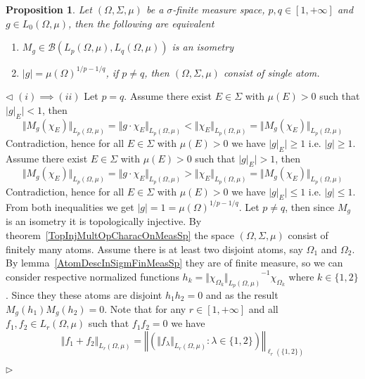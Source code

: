 \documentclass[12pt]{article}
\newtheorem{proposition}[theorem]{Proposition}
\newenvironment{proof}{\par $\triangleleft$}{$\triangleright$}
\begin{document}
\begin{proposition}\label{IsomMultOpCharacOnMeasSp}
    Let $(\Omega,\Sigma,\mu)$ be a $\sigma$-finite measure space,
    $p,q\in[1,+\infty]$ and $g\in L_0(\Omega,\mu)$, then the following
    are equivalent
    \begin{enumerate}[label = (\roman*)]
        \item $M_g\in\mathcal{B}(L_p(\Omega,\mu),L_q(\Omega,\mu))$ is
              an isometry

        \item $|g|={\mu(\Omega)}^{1/p-1/q}$, if $p\neq q$,
              then $(\Omega,\Sigma,\mu)$ consist of single atom.
    \end{enumerate}
\end{proposition}
\begin{proof} $(i)\implies (ii)$ Let $p=q$. Assume there exist
    $E\in\Sigma$ with $\mu(E)>0$ such that $|g|_E|<1$, then
    $$
        \Vert M_g(\chi_E)\Vert_{L_p(\Omega,\mu)} =\Vert
        g\cdot\chi_E\Vert_{L_p(\Omega,\mu)} <\Vert\chi_E\Vert_{L_p(\Omega,\mu)}
        =\Vert M_g(\chi_E)\Vert_{L_p(\Omega,\mu)}
    $$
    Contradiction, hence for all $E\in\Sigma$ with $\mu(E)>0$ we
    have $|g|_E|\geq 1$ i.e.  $|g|\geq 1$. Assume there exist
    $E\in\Sigma$ with $\mu(E)>0$ such that $|g|_E|>1$, then
    $$
        \Vert M_g(\chi_E)\Vert_{L_p(\Omega,\mu)} =\Vert
        g\cdot\chi_E\Vert_{L_p(\Omega,\mu)} >\Vert\chi_E\Vert_{L_p(\Omega,\mu)}
        =\Vert M_g(\chi_E)\Vert_{L_p(\Omega,\mu)}
    $$
    Contradiction, hence for all $E\in\Sigma$ with $\mu(E)>0$ we have
    $|g|_E|\leq 1$ i.e.  $|g|\leq 1$. From both inequalities we get
    $|g|=1={\mu(\Omega)}^{1/p-1/q}$. Let $p\neq q$, then since $M_g$ is an
    isometry it is topologically injective. By
    theorem~\ref{TopInjMultOpCharacOnMeasSp} the space $(\Omega,\Sigma,\mu)$
    consist of finitely many atoms. Assume there is at least two disjoint
    atoms, say $\Omega_1$ and $\Omega_2$. By lemma~\ref{AtomDescInSigmFinMeasSp}
    they are of finite measure, so we can consider respective normalized
    functions
    $h_k={\Vert\chi_{\Omega_k}\Vert_{L_p(\Omega,\mu)}}^{-1}\chi_{\Omega_k}$
    where $k\in \{1,2 \}$. Since they these atoms are disjoint $h_1h_2=0$ and
    as the result $M_g(h_1)M_g(h_2)=0$. Note that for any $r\in[1,+\infty]$ and
    all $f_1,f_2\in L_r(\Omega,\mu)$ such that $f_1f_2=0$ we have
    $$
        \Vert f_1+f_2\Vert_{L_r(\Omega,\mu)} =\left\Vert\left(\Vert
        f_\lambda\Vert_{L_r(\Omega,\mu)}:\lambda\in \{1,2
        \}\right)\right\Vert_{\ell_r( \{1,2 \})}
    $$

\end{proof}
\end{document}
